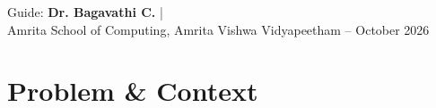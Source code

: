 \documentclass[aspectratio=169, 11pt]{beamer}
\begin{document}
\begin{frame}
    Guide: \textbf{Dr. Bagavathi C.} \quad |  \\
    {\scriptsize Amrita School of Computing, Amrita Vishwa Vidyapeetham \quad -- \quad October 2026}
\end{frame}


\section{Problem \& Context}
\end{document}

